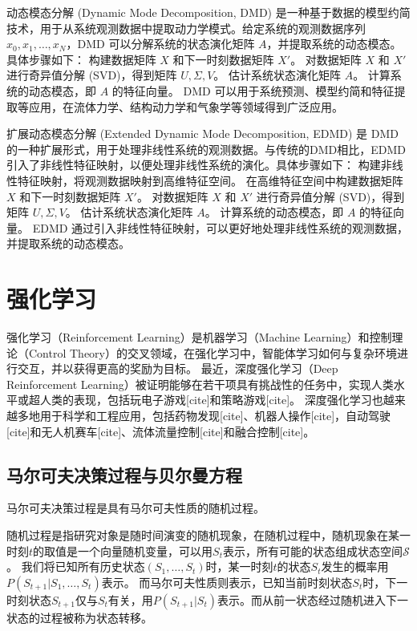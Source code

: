 \documentclass[AutoFakeBold]{LZUThesis}
\begin{document}
动态模态分解 (Dynamic Mode Decomposition, DMD) 是一种基于数据的模型约简技术，用于从系统观测数据中提取动力学模式。给定系统的观测数据序列 ${x_0, x_1, \dots, x_N}$，DMD 可以分解系统的状态演化矩阵 $A$，并提取系统的动态模态。具体步骤如下：
构建数据矩阵 $X$ 和下一时刻数据矩阵 $X'$。
对数据矩阵 $X$ 和 $X'$ 进行奇异值分解 (SVD)，得到矩阵 $U, \Sigma, V$。
估计系统状态演化矩阵 $A$。
计算系统的动态模态，即 $A$ 的特征向量。
DMD 可以用于系统预测、模型约简和特征提取等应用，在流体力学、结构动力学和气象学等领域得到广泛应用。

扩展动态模态分解 (Extended Dynamic Mode Decomposition, EDMD) 是 DMD 的一种扩展形式，用于处理非线性系统的观测数据。与传统的DMD相比，EDMD引入了非线性特征映射，以便处理非线性系统的演化。具体步骤如下：
构建非线性特征映射，将观测数据映射到高维特征空间。
在高维特征空间中构建数据矩阵 $X$ 和下一时刻数据矩阵 $X'$。
对数据矩阵 $X$ 和 $X'$ 进行奇异值分解 (SVD)，得到矩阵 $U, \Sigma, V$。
估计系统状态演化矩阵 $A$。
计算系统的动态模态，即 $A$ 的特征向量。
EDMD 通过引入非线性特征映射，可以更好地处理非线性系统的观测数据，并提取系统的动态模态。


\section{强化学习}
强化学习（Reinforcement Learning）是机器学习（Machine Learning）和控制理论（Control Theory）的交叉领域，在强化学习中，智能体学习如何与复杂环境进行交互，并以获得更高的奖励为目标。
最近，深度强化学习（Deep Reinforcement Learning）被证明能够在若干项具有挑战性的任务中，实现人类水平或超人类的表现，包括玩电子游戏[cite]和策略游戏[cite]。
深度强化学习也越来越多地用于科学和工程应用，包括药物发现[cite]、机器人操作[cite]，自动驾驶[cite]和无人机赛车[cite]、流体流量控制[cite]和融合控制[cite]。

\subsection{马尔可夫决策过程与贝尔曼方程}
马尔可夫决策过程是具有马尔可夫性质的随机过程。

随机过程是指研究对象是随时间演变的随机现象，在随机过程中，随机现象在某一时刻$t$的取值是一个向量随机变量，可以用$S_t$表示，所有可能的状态组成状态空间$\mathcal{S}$。
我们将已知所有历史状态$( S_1,\dots,S_t )$时，某一时刻$t$的状态$S_t$发生的概率用$P( S_{t + 1} | S_1,\dots,S_t )$表示。
而马尔可夫性质则表示，已知当前时刻状态$S_t$时，下一时刻状态$S_{t + 1}$仅与$S_t$有关，用$P( S_{t + 1} | S_t)$表示。而从前一状态经过随机进入下一状态的过程被称为状态转移。
\end{document}
